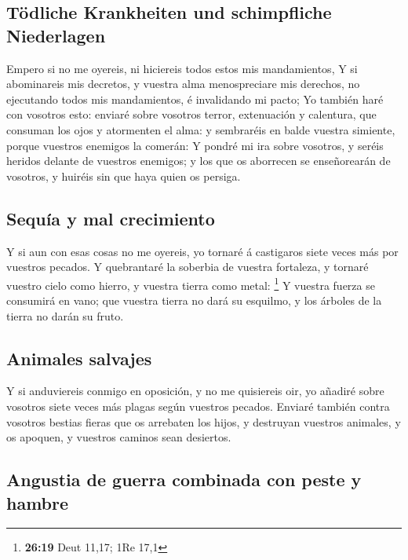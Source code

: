 \hypertarget{tuxf6dliche-krankheiten-und-schimpfliche-niederlagen}{%
\subsection{Tödliche Krankheiten und schimpfliche
Niederlagen}\label{tuxf6dliche-krankheiten-und-schimpfliche-niederlagen}}

 Empero si no me oyereis, ni hiciereis todos estos mis
mandamientos,  Y si abominareis mis decretos, y vuestra
alma menospreciare mis derechos, no ejecutando todos mis mandamientos, é
invalidando mi pacto;  Yo también haré con vosotros esto:
enviaré sobre vosotros terror, extenuación y calentura, que consuman los
ojos y atormenten el alma: y sembraréis en balde vuestra simiente,
porque vuestros enemigos la comerán:  Y pondré mi ira sobre
vosotros, y seréis heridos delante de vuestros enemigos; y los que os
aborrecen se enseñorearán de vosotros, y huiréis sin que haya quien os
persiga.

\hypertarget{sequuxeda-y-mal-crecimiento}{%
\subsection{Sequía y mal
crecimiento}\label{sequuxeda-y-mal-crecimiento}}

 Y si aun con esas cosas no me oyereis, yo tornaré á
castigaros siete veces más por vuestros pecados.  Y
quebrantaré la soberbia de vuestra fortaleza, y tornaré vuestro cielo
como hierro, y vuestra tierra como metal: \footnote{\textbf{26:19} Deut
  11,17; 1Re 17,1}  Y vuestra fuerza se consumirá en vano;
que vuestra tierra no dará su esquilmo, y los árboles de la tierra no
darán su fruto.

\hypertarget{animales-salvajes}{%
\subsection{Animales salvajes}\label{animales-salvajes}}

 Y si anduviereis conmigo en oposición, y no me quisiereis
oir, yo añadiré sobre vosotros siete veces más plagas según vuestros
pecados.  Enviaré también contra vosotros bestias fieras
que os arrebaten los hijos, y destruyan vuestros animales, y os apoquen,
y vuestros caminos sean desiertos.

\hypertarget{angustia-de-guerra-combinada-con-peste-y-hambre}{%
\subsection{Angustia de guerra combinada con peste y
hambre}\label{angustia-de-guerra-combinada-con-peste-y-hambre}}


